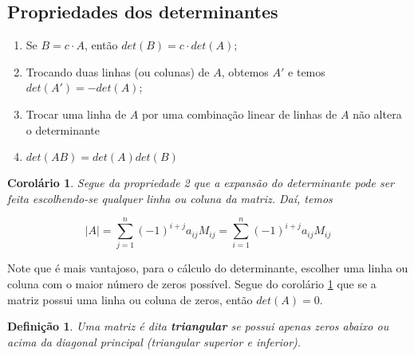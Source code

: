 \documentclass{article}
\newtheorem{corollary}{Corolário}[theorem]
\newtheorem*{definition}{Definição}
\begin{document}
\subsection{Propriedades dos determinantes}
\begin{enumerate}
	\item Se $B = c\cdot A$, então $det(B) = c\cdot det(A)$;
	\item Trocando duas linhas (ou colunas) de $A$, obtemos $A'$ e temos $det(A') = -det(A)$;
	\item Trocar uma linha de $A$ por uma combinação linear de linhas de $A$ não altera o determinante 
	\item $det(AB) = det(A)det(B)$
\end{enumerate}

\begin{corollary}
	\label{expansao}
	Segue da propriedade 2 que a expansão do determinante pode ser feita escolhendo-se qualquer linha ou coluna da matriz. Daí, temos
	
	\begin{equation*}
	|A| = \sum_{j=1}^{n}(-1)^{i+j}a_{ij}M_{ij} = \sum_{i=1}^{n}(-1)^{i+j}a_{ij}M_{ij}
	\end{equation*}
\end{corollary}
\par\vspace{0.3cm} Note que é mais vantajoso, para o cálculo do determinante, escolher uma linha ou coluna com o maior número de zeros possível. Segue do corolário \ref{expansao} que se a matriz possui uma linha ou coluna de zeros, então $det(A) = 0$.

\begin{definition}
	Uma matriz é dita \textbf{triangular} se possui apenas zeros abaixo ou acima da diagonal principal (triangular superior e inferior).
\end{definition}
\end{document}
